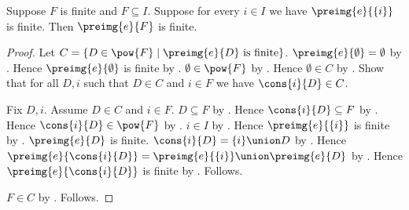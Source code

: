 \begin{theorem}\label{spike_finite_preimage_under_finite_fibers}
    Suppose $F$ is finite and $F\subseteq I$.
    Suppose for every $i\in I$ we have $\preimg{e}{\{i\}}$ is finite.
    Then $\preimg{e}{F}$ is finite.
\end{theorem}
\begin{proof}
    Let $C=\{D\in\pow{F}\mid
        \text{$\preimg{e}{D}$ is finite}\}$.
    $\preimg{e}{\emptyset}=\emptyset$ by
        .
    Hence $\preimg{e}{\emptyset}$ is finite by
        .
    $\emptyset\in\pow{F}$ by .
    Hence $\emptyset\in C$ by \auto.
    Show that for all $D,i$ such that $D\in C$ and $i\in F$ we have
        $\cons{i}{D}\in C$.
    \begin{subproof}
        Fix $D,i$.
        Assume $D\in C$ and $i\in F$.
        $D\subseteq F$ by .
        Hence $\cons{i}{D}\subseteq F$ by
            .
        Hence $\cons{i}{D}\in\pow{F}$ by
            .
        $i\in I$ by .
        Hence $\preimg{e}{\{i\}}$ is finite by \auto.
        $\preimg{e}{D}$ is finite.
        $\cons{i}{D}=\{i\}\union D$ by
            .
        Hence
            $\preimg{e}{\cons{i}{D}}
                =\preimg{e}{\{i\}}\union\preimg{e}{D}$ by
            .
        Hence $\preimg{e}{\cons{i}{D}}$ is finite by
            .
        Follows.
    \end{subproof}
    $F\in C$ by .
    Follows.
\end{proof}


